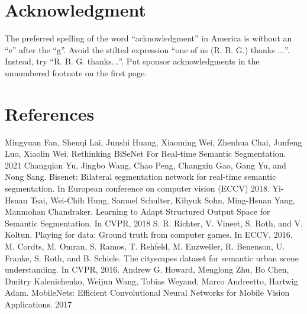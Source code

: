 \documentclass[conference]{IEEEtran}
\begin{document}
\section*{Acknowledgment}

The preferred spelling of the word ``acknowledgment'' in America is without 
an ``e'' after the ``g''. Avoid the stilted expression ``one of us (R. B. 
G.) thanks $\ldots$''. Instead, try ``R. B. G. thanks$\ldots$''. Put sponsor 
acknowledgments in the unnumbered footnote on the first page.

\section*{References}

\begin{thebibliography}{00}
 Mingyuan Fan, Shenqi Lai, Junshi Huang, Xiaoming Wei, Zhenhua Chai, Junfeng Luo, Xiaolin Wei. Rethinking BiSeNet For Real-time Semantic Segmentation. 2021
 Changqian Yu, Jingbo Wang, Chao Peng, Changxin Gao, Gang Yu, and Nong Sang. Bisenet: Bilateral segmentation network for real-time semantic segmentation. In European conference on computer vision (ECCV) 2018.
 Yi-Hsuan Tsai, Wei-Chih Hung, Samuel Schulter, Kihyuk Sohn, Ming-Hsuan Yang, Manmohan Chandraker. Learning to Adapt Structured Output Space for Semantic Segmentation. In CVPR, 2018
 S. R. Richter, V. Vineet, S. Roth, and V. Koltun. Playing for data: Ground truth from computer games. In ECCV, 2016.
 M. Cordts, M. Omran, S. Ramos, T. Rehfeld, M. Enzweiler, R. Benenson, U. Franke, S. Roth, and B. Schiele. The cityscapes dataset for semantic urban scene understanding. In CVPR, 2016. 
 Andrew G. Howard, Menglong Zhu, Bo Chen, Dmitry Kalenichenko, Weijun Wang, Tobias Weyand, Marco Andreetto, Hartwig Adam. MobileNets: Efficient Convolutional Neural Networks for Mobile Vision Applications. 2017
\end{thebibliography}
\vspace{12pt}
\end{document}
